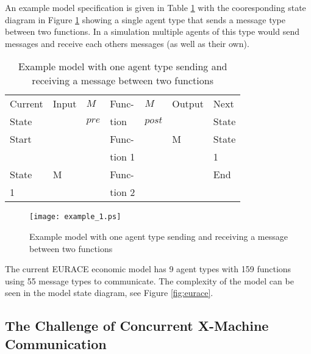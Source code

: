 \documentclass{aamas2009}
\begin{document}
An example model specification is given in Table \ref{tab:simpleexample} with
the cooresponding state diagram in Figure \ref{tab:simpleexample} showing a
single agent type that sends a message type between two functions. In a
simulation multiple agents of this type would send messages and receive each
others messages (as well as their own).

\begin{table}[hbp]
\centering
\begin{tabular}{|l|l|l||l||l|l|l|}
\hline
Current&Input&$M$&Func-&$M$&Output&Next\\
State&&$pre$&tion&$post$&&State\\
\hline
\hline
Start&&&Func-&&M&State\\
&&&tion 1&&&1\\
\hline
State&M&&Func-&&&End\\
1&&&tion 2&&&\\
\hline
\end{tabular}
\caption{Example model with one agent type sending and receiving a message
between two functions}
\label{tab:simpleexample}
\end{table}

\begin{figure}[hbp]
\centering
\texttt{[image: example\_1.ps]}
\caption{Example model with one agent type sending and receiving a message
between two functions}
\label{fig:simpleexample}
\end{figure}

The current EURACE economic model has 9 agent types with 159 functions using 55
message types to communicate. The complexity of the model can be seen in the
model state diagram, see Figure \ref{fig:eurace}.

\subsection{The Challenge of Concurrent X-Machine Communication}
\end{document}
